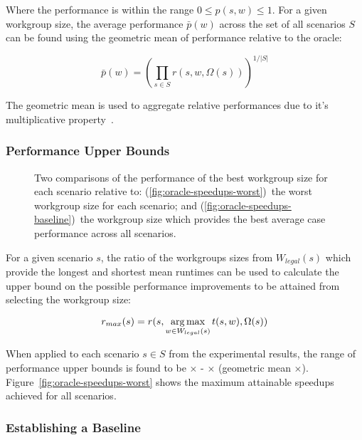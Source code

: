 Where the performance is within the range $0 \le p(s,w) \le 1$. For a
given workgroup size, the average performance $\bar{p}(w)$ across the
set of all scenarios $S$ can be found using the geometric mean of
performance relative to the oracle:

\begin{equation}
\bar{p}(w) =
\left(
  \prod_{s \in S} r(s, w, \Omega(s))
\right)^{1/|S|}
\end{equation}

The geometric mean is used to aggregate relative performances due to
it's multiplicative property~\cite{Fleming1986}.


\subsubsection{Performance Upper Bounds}

\begin{figure}

\caption{%
  Two comparisons of the performance of the best workgroup size for
  each scenario relative to: (\ref{fig:oracle-speedups-worst})~the
  worst workgroup size for each scenario; and
  (\ref{fig:oracle-speedups-baseline})~the workgroup size which
  provides the best average case performance across all scenarios.%
}
\label{fig:speedups}
\end{figure}

For a given scenario $s$, the ratio of the workgroups sizes from
$W_{legal}(s)$ which provide the longest and shortest mean runtimes
can be used to calculate the upper bound on the possible performance
improvements to be attained from selecting the workgroup size:

\begin{equation}
r_{max}(s) = r(s, \operatorname*{arg\,max}_{w \in W_{legal}(s)} t(s,w), \Omega(s))
\end{equation}

When applied to each scenario $s \in S$ from the experimental results,
the range of performance upper bounds is found to be
$\times$ -
$\times$ (geometric mean
$\times$). Figure~\ref{fig:oracle-speedups-worst}
shows the maximum attainable speedups achieved for all scenarios.


\subsubsection{Establishing a Baseline}

